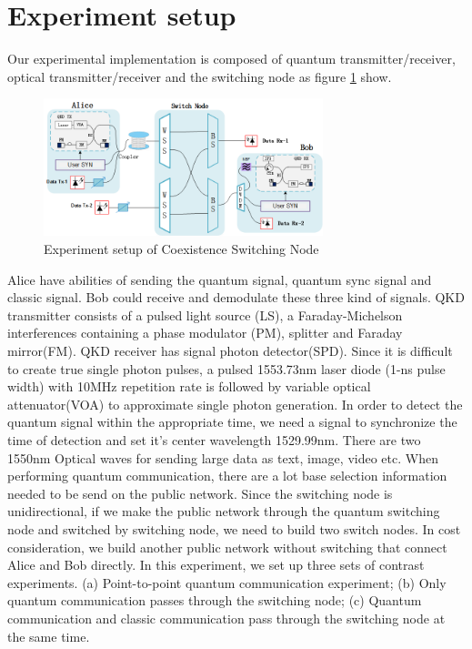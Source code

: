 \documentclass[letterpaper,10pt]{article}
\begin{document}
\section{Experiment setup}
Our experimental implementation is composed of quantum transmitter/receiver, optical transmitter/receiver and the switching node as figure \ref{Fig:experiment_of_switching_node} show.
\begin{figure}
 \centering
 \includegraphics[height= 4cm,width=.6\linewidth]{experiment_of_switching_node}
 \caption{Experiment setup of Coexistence Switching Node}
 \label{Fig:experiment_of_switching_node}
\end{figure}
Alice have abilities of sending the quantum signal, quantum sync signal and classic signal. Bob could receive and demodulate these three kind of signals. QKD transmitter consists of a pulsed light source (LS), a Faraday-Michelson interferences containing a phase modulator (PM), splitter and Faraday mirror(FM). QKD receiver has signal photon detector(SPD). Since it is difficult to create true single photon pulses, a pulsed 1553.73nm laser diode (1-ns pulse width) with 10MHz repetition rate is followed by variable optical attenuator(VOA) to approximate single photon generation. In order to detect the quantum signal within the appropriate time, we need a signal to synchronize the time of detection and set it's center wavelength 1529.99nm. There are two 1550nm Optical waves for sending large data as text, image, video etc. When performing quantum communication, there are a lot base selection information needed to be send on the public network. Since the switching node is unidirectional, if we make the public network through the quantum switching node and switched by switching node, we need to build two switch nodes. In cost consideration, we build another public network without switching  that connect Alice and Bob directly. In this experiment, we set up three sets of contrast experiments. (a) Point-to-point quantum communication experiment; (b) Only quantum communication passes through the switching node; (c) Quantum communication and classic communication pass through the switching node at the same time.
\end{document}
